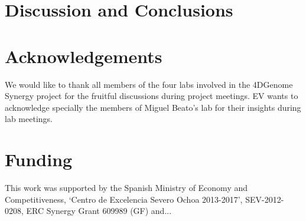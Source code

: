 \documentclass{bioinfo}
\begin{document}
\section{Discussion and Conclusions}


\section*{Acknowledgements}

We would like to thank all members of the four labs involved in the 4DGenome Synergy project for the fruitful discussions during project meetings. EV wants to acknowledge specially the members of Miguel Beato's lab for their insights during lab meetings.

\section*{Funding}

This work was supported by the Spanish Ministry of Economy and
Competitiveness, ‘Centro de Excelencia Severo Ochoa 2013-2017’,
SEV-2012-0208, ERC Synergy Grant 609989 (GF) and...
\vspace*{-12pt}



\end{document}
